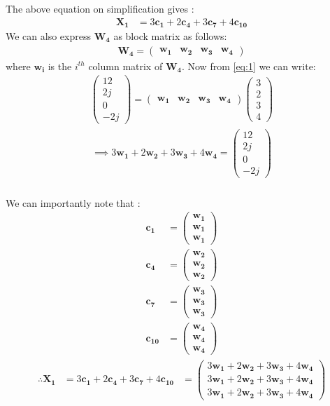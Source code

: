 \documentclass{beamer}
\newcommand{\myvec}[1]{\ensuremath{\begin{pmatrix}#1\end{pmatrix}}}
\renewcommand{\vec}[1]{\mathbf{#1}}
\begin{document}
\begin{frame}
\frametitle{}
The above equation on simplification gives :
\begin{align}
\vec{X_{1}} &= 3\vec{c_{1}} + 2\vec{c_{4}} + 3\vec{c_{7}} + 4\vec{c_{10}}\label{eq:3}   
\end{align}
We can also express $\vec{W_{4}}$ as block matrix as follows:
\begin{align}
\vec{W_{4}} = \myvec{\vec{w_{1}} &\vec{w_{2}} &\vec{w_{3}} &\vec{w_{4}}}
\end{align}
where $\vec{w_{i}}$ is the $i^{th}$ column matrix of $\vec{W_{4}}$. Now from \eqref{eq:1} we can write:
\begin{align}
\myvec{12 \\ 2j \\ 0 \\ -2j} =
\myvec{\vec{w_{1}} &\vec{w_{2}} &\vec{w_{3}} &\vec{w_{4}}}\myvec{3 \\ 2 \\ 3 \\4}
\end{align}
\begin{align}
\implies 3\vec{w_{1}} + 2\vec{w_{2}} + 3\vec{w_{3}} + 4\vec{w_{4}} = \myvec{12 \\ 2j \\ 0 \\ -2j}\label{eq:4}
\end{align}
\end{frame}

\begin{frame}
\frametitle{}
 We can importantly note that :
\begin{align}
\vec{c_{1}} &= \myvec{\vec{w_{1}} \\ \vec{w_{1}} \\ \vec{w_{1}}}\\
\vec{c_{4}} &= \myvec{\vec{w_{2}} \\ \vec{w_{2}} \\ \vec{w_{2}}}\\
\vec{c_{7}} &= \myvec{\vec{w_{3}} \\ \vec{w_{3}} \\ \vec{w_{3}}}\\
\vec{c_{10}} &= \myvec{\vec{w_{4}} \\ \vec{w_{4}} \\ \vec{w_{4}}}
\end{align}
\begin{align}
\therefore \vec{X_{1}} &=3\vec{c_{1}} + 2\vec{c_{4}} + 3\vec{c_{7}} + 4\vec{c_{10}}
&= \myvec{3\vec{w_{1}} + 2\vec{w_{2}} + 3\vec{w_{3}} + 4\vec{w_{4}}\\ 3\vec{w_{1}} + 2\vec{w_{2}} + 3\vec{w_{3}} + 4\vec{w_{4}}\\3\vec{w_{1}} + 2\vec{w_{2}} + 3\vec{w_{3}} + 4\vec{w_{4}}}\label{eq:5}
\end{align}
\end{frame}
\end{document}
